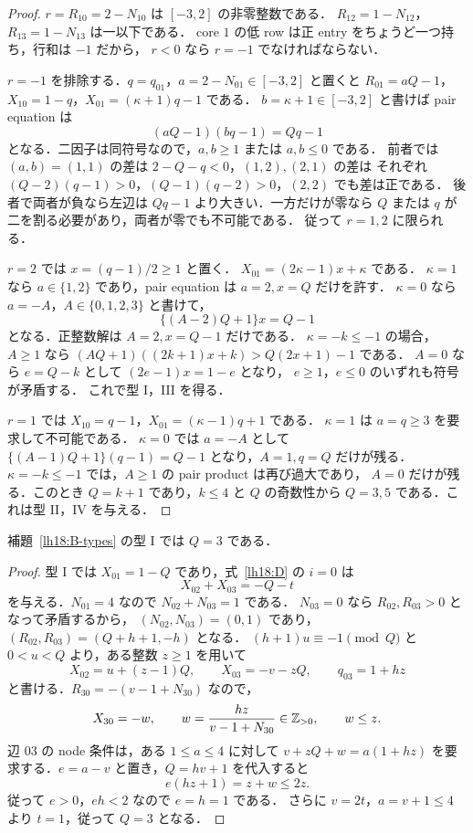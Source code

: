 \begin{proof}
$r=R_{10}=2-N_{10}$ は $[-3,2]$ の非零整数である．
$R_{12}=1-N_{12}$，$R_{13}=1-N_{13}$ は一以下である．
core $1$ の低 row は正 entry をちょうど一つ持ち，行和は $-1$ だから，
$r<0$ なら $r=-1$ でなければならない．

$r=-1$ を排除する．$q=q_{01}$，$a=2-N_{01}\in[-3,2]$ と置くと
$R_{01}=aQ-1$，$X_{10}=1-q$，$X_{01}=(\kappa+1)q-1$ である．
$b=\kappa+1\in[-3,2]$ と書けば pair equation は
\[
 (aQ-1)(bq-1)=Qq-1
\]
となる．二因子は同符号なので，$a,b\ge1$ または $a,b\le0$ である．
前者では $(a,b)=(1,1)$ の差は $2-Q-q<0$，$(1,2),(2,1)$ の差は
それぞれ $(Q-2)(q-1)>0$，$(Q-1)(q-2)>0$，$(2,2)$ でも差は正である．
後者で両者が負なら左辺は $Qq-1$ より大きい．一方だけが零なら
$Q$ または $q$ が二を割る必要があり，両者が零でも不可能である．
従って $r=1,2$ に限られる．

$r=2$ では $x=(q-1)/2\ge1$ と置く．
$X_{01}=(2\kappa-1)x+\kappa$ である．
$\kappa=1$ なら $a\in\{1,2\}$ であり，pair equation は
$a=2,x=Q$ だけを許す．
$\kappa=0$ なら $a=-A$，$A\in\{0,1,2,3\}$ と書けて，
\[
 \{(A-2)Q+1\}x=Q-1
\]
となる．正整数解は $A=2,x=Q-1$ だけである．
$\kappa=-k\le-1$ の場合，$A\ge1$ なら
$(AQ+1)((2k+1)x+k)>Q(2x+1)-1$ である．
$A=0$ なら $e=Q-k$ として $(2e-1)x=1-e$ となり，
$e\ge1$，$e\le0$ のいずれも符号が矛盾する．
これで型 I，III を得る．

$r=1$ では $X_{10}=q-1$，$X_{01}=(\kappa-1)q+1$ である．
$\kappa=1$ は $a=q\ge3$ を要求して不可能である．
$\kappa=0$ では $a=-A$ として
$\{(A-1)Q+1\}(q-1)=Q-1$ となり，$A=1,q=Q$ だけが残る．
$\kappa=-k\le-1$ では，$A\ge1$ の pair product は再び過大であり，
$A=0$ だけが残る．このとき $Q=k+1$ であり，$k\le4$ と $Q$ の奇数性から
$Q=3,5$ である．これは型 II，IV を与える．
\end{proof}

\begin{lemma}[型 I は葉分母三に限られる]\label{lh18:typeI-small}
補題~\ref{lh18:B-types} の型 I では $Q=3$ である．
\end{lemma}

\begin{proof}
型 I では $X_{01}=1-Q$ であり，式~\eqref{lh18:D} の $i=0$ は
\[
 X_{02}+X_{03}=-Q-t
\]
を与える．$N_{01}=4$ なので $N_{02}+N_{03}=1$ である．
$N_{03}=0$ なら $R_{02},R_{03}>0$ となって矛盾するから，
$(N_{02},N_{03})=(0,1)$ であり，$(R_{02},R_{03})=(Q+h+1,-h)$ となる．
$(h+1)u\equiv-1\pmod Q$ と $0<u<Q$ より，ある整数 $z\ge1$ を用いて
\[
 X_{02}=u+(z-1)Q,\qquad X_{03}=-v-zQ,\qquad q_{03}=1+hz
\]
と書ける．$R_{30}=-(v-1+N_{30})$ なので，
\[
 X_{30}=-w,\qquad
 w=\frac{hz}{v-1+N_{30}}\in\mathbb Z_{>0},\qquad w\le z.
\]
辺 $03$ の node 条件は，ある $1\le a\le4$ に対して
$v+zQ+w=a(1+hz)$ を要求する．$e=a-v$ と置き，$Q=hv+1$ を代入すると
\[
 e(hz+1)=z+w\le2z.
\]
従って $e>0$，$eh<2$ なので $e=h=1$ である．
さらに $v=2t$，$a=v+1\le4$ より $t=1$，従って $Q=3$ となる．
\end{proof}

